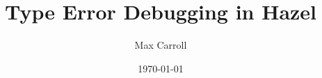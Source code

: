 \title{Type Error Debugging in Hazel}
\newcommand{\thesubtitle}{}
\author{Max Carroll}
\date{\today}
\newcommand{\tripos}{Computer Science Tripos, Part II}
\newcommand{\degree}{Bachelor of Arts}
\newcommand{\university}{University of Cambridge}
\newcommand{\college}{Sidney Sussex College}
\newcommand{\supervisors}{Patrick Ferris, Anil Madhavapeddy}
\newcommand{\candidatenumber}{Candidate Number Here}
\newcommand{\submissiondeadline}{05/2025}
\newcommand{\projectoriginator}{The Candidate}